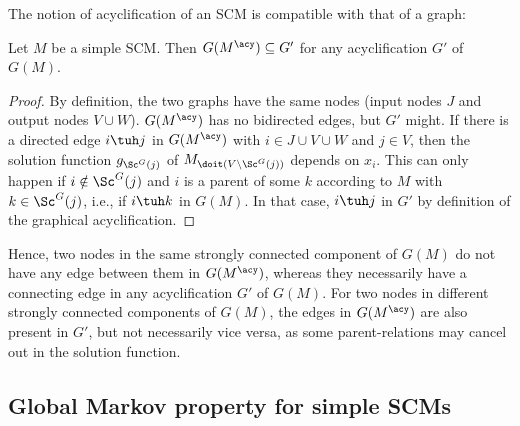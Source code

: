 The notion of acyclification of an SCM is compatible with that of a graph:
\begin{Prp}\label{prp:acyclifications_compatible}
  Let $M$ be a simple SCM.
  Then $G(M^\acy) \subseteq G'$ for any acyclification $G'$ of $G(M)$.
\end{Prp}
\begin{proof}
  By definition, the two graphs have the same nodes (input nodes $J$ and output nodes
  $V \cup W$). $G(M^\acy)$ has no bidirected edges, but $G'$ might. If there is a 
  directed edge $i \tuh j$ in $G(M^\acy)$ with $i \in J \cup V \cup W$ and $j \in V$, then
  the solution function $g_{\Sc^G(j)}$ of $M_{\doit(V\setminus \Sc^G(j))}$ depends on $x_i$. 
  This can only happen if
  $i \notin \Sc^G(j)$ and $i$ is a parent of some $k$ according to $M$ with $k \in \Sc^G(j)$,
  i.e., if $i \tuh k$ in $G(M)$. In that case, $i \tuh j$ in $G'$ by definition of
  the graphical acyclification.
\end{proof}
Hence, two nodes in the same strongly connected component of $G(M)$ do not have any edge between them
in $G(M^\acy)$, whereas they necessarily have a connecting edge in any acyclification $G'$ of $G(M)$.
For two nodes in different strongly connected components of $G(M)$, the edges in $G(M^\acy)$ are also
present in $G'$, but not necessarily vice versa, as some parent-relations may cancel out in the solution function.

\subsection{Global Markov property for simple SCMs}

